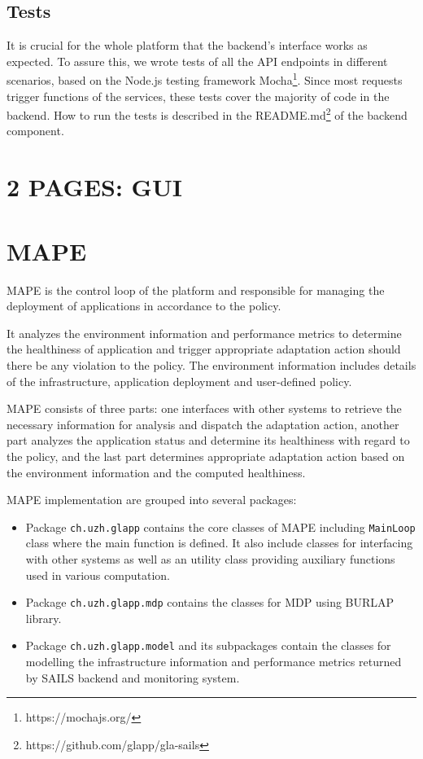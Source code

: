 \documentclass{seal_thesis}
\begin{document}
\subsection{Tests}
It is crucial for the whole platform that the backend's interface works as expected.
To assure this, we wrote tests of all the API endpoints in different scenarios, based on the Node.js testing framework Mocha\footnote{https://mochajs.org/}.
Since most requests trigger functions of the services, these tests cover the majority of code in the backend.
How to run the tests is described in the README.md\footnote{https://github.com/glapp/gla-sails} of the backend component.


\section{2 PAGES: GUI}


\section{MAPE}
MAPE is the control loop of the platform and responsible for managing the deployment of applications in accordance to the policy.


It analyzes the environment information and performance metrics to determine the healthiness of application and trigger appropriate adaptation action should there be any violation to the policy.
The environment information includes details of the infrastructure, application deployment and user-defined policy.

MAPE consists of three parts: one interfaces with other systems to retrieve the necessary information for analysis and dispatch the adaptation action, another part analyzes the application status and determine its healthiness with regard to the policy, and the last part determines appropriate adaptation action based on the environment information and the computed healthiness.

MAPE implementation are grouped into several packages:
\begin{itemize}
\item Package \texttt{ch.uzh.glapp} contains the core classes of MAPE including \texttt{MainLoop} class where the main function is defined.
It also include classes for interfacing with other systems as well as an utility class providing auxiliary functions used in various computation. 
\item Package \texttt{ch.uzh.glapp.mdp} contains the classes for MDP using BURLAP library.
\item Package \texttt{ch.uzh.glapp.model} and its subpackages contain the classes for modelling the infrastructure information and performance metrics returned by SAILS backend and monitoring system.
\end{itemize}
\end{document}

